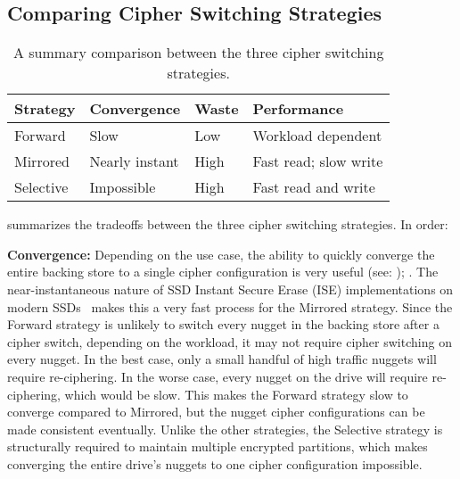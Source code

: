 \subsection{Comparing Cipher Switching Strategies}

\begin{table}[]
   \begin{tabular}{@{}|l|l|l|l|@{}}
      \toprule
      \textbf{Strategy} & \textbf{Convergence} & \textbf{Waste} & \textbf{Performance} \\ \midrule
      Forward   & Slow           & Low  & Workload dependent    \\
      \hline
      Mirrored  & Nearly instant & High & Fast read; slow write \\
      \hline
      Selective & Impossible     & High & Fast read and write   \\
      \hline
   \end{tabular}
   \caption{A summary comparison between the three cipher switching strategies.}
   \label{tbl:strategies-advantages}
\end{table}

 summarizes the tradeoffs between the three cipher
switching strategies. In order:

\textbf{Convergence:} Depending on the use case, the ability to quickly
converge the entire backing store to a single cipher configuration is very
useful (see: ); . The near-instantaneous nature
of SSD Instant Secure Erase (ISE) implementations on modern
SSDs~\cite{ISE1,ISE2,ISE3} makes this a very fast process for the Mirrored
strategy. Since the Forward strategy is unlikely to switch every nugget in the
backing store after a cipher switch, depending on the workload, it may not
require cipher switching on every nugget. In the best case, only a small handful
of high traffic nuggets will require re-ciphering. In the worse case, every
nugget on the drive will require re-ciphering, which would be slow. This makes
the Forward strategy slow to converge compared to Mirrored, but the nugget
cipher configurations can be made consistent eventually. Unlike the other
strategies, the Selective strategy is structurally required to maintain multiple
encrypted partitions, which makes converging the entire drive's nuggets to one
cipher configuration impossible.

